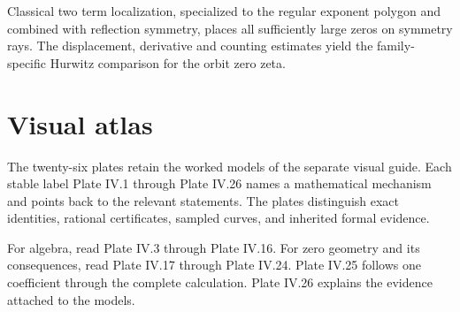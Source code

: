 \documentclass[11pt,letterpaper]{article}
\theoremstyle{definition}
\theoremstyle{remark}
\begin{document}
Classical two term localization, specialized to the regular exponent polygon
and combined with reflection symmetry, places all sufficiently large zeros
on symmetry rays. The displacement, derivative and counting estimates yield
the family-specific Hurwitz comparison for the orbit zero zeta.

\begingroup
\small
\let\prscbibliography\thebibliography
\renewcommand{\thebibliography}[1]{\prscbibliography{#1}\setlength{\itemsep}{0pt}\setlength{\parsep}{0pt}}


\endgroup

\clearpage
\appendix
\section{Visual atlas}\label{app:visual-atlas}
The twenty-six plates retain the worked models of the separate visual guide. Each stable label Plate IV.1 through Plate IV.26 names a mathematical mechanism and points back to the relevant statements. The plates distinguish exact identities, rational certificates, sampled curves, and inherited formal evidence.
\begin{readerroadmap}[title={Three routes through the atlas}]
For algebra, read Plate IV.3 through Plate IV.16. For zero geometry and its consequences, read Plate IV.17 through Plate IV.24. Plate IV.25 follows one coefficient through the complete calculation. Plate IV.26 explains the evidence attached to the models.
\end{readerroadmap}
\clearpage
\begingroup
\fontsize{10}{12}\selectfont\setlength{\parskip}{4pt}
\setlength{\abovedisplayskip}{6pt}\setlength{\belowdisplayskip}{6pt}

\endgroup
\end{document}

